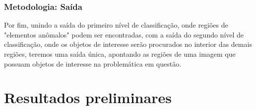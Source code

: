 \documentclass[t]{beamer}
\begin{document}
\begin{frame}
	\frametitle{Metodologia: Saída}

	Por fim, unindo a saída do primeiro nível de classificação, onde regiões de "elementos anômalos" podem ser encontradas, com a saída do segundo nível de classificação, onde os objetos de interesse serão procurados no interior das demais regiões, teremos uma saída única, apontando as regiões de uma imagem que possuam objetos de interesse na problemática em questão.

\end{frame}


\section{Resultados preliminares}
\end{document}
